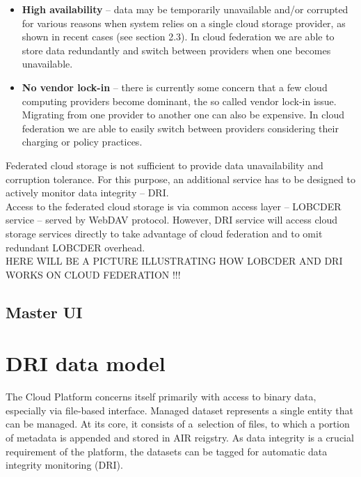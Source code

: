 \begin{itemize}
	\item \textbf{High availability} -- data may be temporarily unavailable 
	and/or corrupted for various reasons when system relies on a single cloud 
	storage provider, as shown in recent cases (see section 2.3). In cloud
	federation we are able to store data redundantly and switch between 
	providers when one becomes unavailable.
	\item \textbf{No vendor lock-in} -- there is currently some concern that 
	a few cloud computing providers become dominant, the so called vendor 
	lock-in issue. Migrating from one provider to another one can also be
	expensive. In cloud federation we are able to easily switch between
	providers considering their charging or policy practices.
\end{itemize}

Federated cloud storage is not sufficient to provide data unavailability 
and corruption tolerance. For this purpose, an additional service
has to be designed to actively monitor data integrity -- DRI.\\

Access to the federated cloud storage is via common access layer -- LOBCDER
service -- served by WebDAV protocol. However, DRI service will access
cloud storage services directly to take advantage of cloud federation and
to omit redundant LOBCDER overhead.\\

HERE WILL BE A PICTURE ILLUSTRATING HOW LOBCDER AND DRI WORKS ON CLOUD
FEDERATION !!!
		\subsection{Master UI}
		\label{master-ui}

	\section{DRI data model}
The Cloud Platform concerns itself primarily with access to binary data, 
especially via file-based interface. Managed dataset represents a single entity
that can be managed. At its core, it consists of a~selection of
files, to which a portion of metadata is appended and stored in AIR reigstry. 
As data integrity is a crucial requirement of the platform, the datasets can be
tagged for automatic data integrity monitoring (DRI). 

